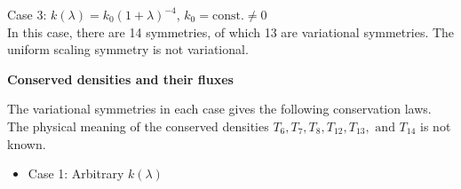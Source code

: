 \documentclass[landscape]{slides}
\def\const{\text{const.}}
\begin{document}
Case 3: $k(\lambda) = k_0 (1+\lambda)^{-4}$,
\quad
$k_0 = \const\neq 0$\\
In this case, there are 14 symmetries, of which 13 are variational symmetries. The uniform scaling symmetry is not variational.

\newpage

\begin{center}
\textbf{Conserved densities and their fluxes}
\end{center}

The variational symmetries in each case gives the following conservation laws. 
The physical meaning of the conserved densities $T_6, T_7, T_8, T_{12}, T_{13}, \text{ and } T_{14}$ is not known.

\begin{itemize}
\item
Case 1: Arbitrary $k(\lambda)$


\end{itemize}
\end{document}
